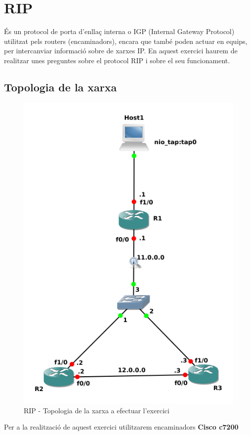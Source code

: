 \documentclass[10pt]{article}
\begin{document}
\section{RIP}
És un protocol de porta d'enllaç interna o IGP (Internal Gateway Protocol) utilitzat pels routers (encaminadors), encara que també poden actuar en equips, per intercanviar informació sobre de xarxes IP. En aquest exercici haurem de realitzar unes preguntes sobre el protocol RIP i sobre el seu funcionament. 
\subsection{Topologia de la xarxa}
\begin{figure}[H]
\begin{center}
\includegraphics[scale=0.7]{Images/rip.png}
\caption{RIP - Topologia de la xarxa a efectuar l'exercici}
\end{center}
\end{figure}
Per a la realització de aquest exercici utilitzarem encaminadors \textbf{Cisco c7200}
\end{document}
